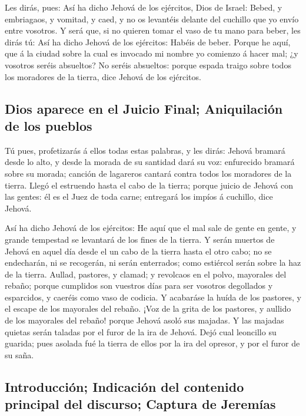  Les dirás, pues: Así ha dicho Jehová de los ejércitos,
Dios de Israel: Bebed, y embriagaos, y vomitad, y caed, y no os
levantéis delante del cuchillo que yo envío entre vosotros.
 Y será que, si no quieren tomar el vaso de tu mano para
beber, les dirás tú: Así ha dicho Jehová de los ejércitos: Habéis de
beber.  Porque he aquí, que á la ciudad sobre la cual es
invocado mi nombre yo comienzo á hacer mal; ¿y vosotros seréis
absueltos? No seréis absueltos: porque espada traigo sobre todos los
moradores de la tierra, dice Jehová de los ejércitos.

\hypertarget{dios-aparece-en-el-juicio-final-aniquilaciuxf3n-de-los-pueblos}{%
\subsection{Dios aparece en el Juicio Final; Aniquilación de los
pueblos}\label{dios-aparece-en-el-juicio-final-aniquilaciuxf3n-de-los-pueblos}}

 Tú pues, profetizarás á ellos todas estas palabras, y
les dirás: Jehová bramará desde lo alto, y desde la morada de su
santidad dará su voz: enfurecido bramará sobre su morada; canción de
lagareros cantará contra todos los moradores de la tierra.
 Llegó el estruendo hasta el cabo de la tierra; porque
juicio de Jehová con las gentes: él es el Juez de toda carne; entregará
los impíos á cuchillo, dice Jehová.

 Así ha dicho Jehová de los ejércitos: He aquí que el mal
sale de gente en gente, y grande tempestad se levantará de los fines de
la tierra.  Y serán muertos de Jehová en aquel día desde
el un cabo de la tierra hasta el otro cabo; no se endecharán, ni se
recogerán, ni serán enterrados; como estiércol serán sobre la haz de la
tierra.  Aullad, pastores, y clamad; y revolcaos en el
polvo, mayorales del rebaño; porque cumplidos son vuestros días para ser
vosotros degollados y esparcidos, y caeréis como vaso de codicia.
 Y acabaráse la huída de los pastores, y el escape de los
mayorales del rebaño.  ¡Voz de la grita de los pastores,
y aullido de los mayorales del rebaño! porque Jehová asoló sus majadas.
 Y las majadas quietas serán taladas por el furor de la
ira de Jehová.  Dejó cual leoncillo su guarida; pues
asolada fué la tierra de ellos por la ira del opresor, y por el furor de
su saña.

\hypertarget{introducciuxf3n-indicaciuxf3n-del-contenido-principal-del-discurso-captura-de-jeremuxedas}{%
\subsection{Introducción; Indicación del contenido principal del
discurso; Captura de
Jeremías}\label{introducciuxf3n-indicaciuxf3n-del-contenido-principal-del-discurso-captura-de-jeremuxedas}}

